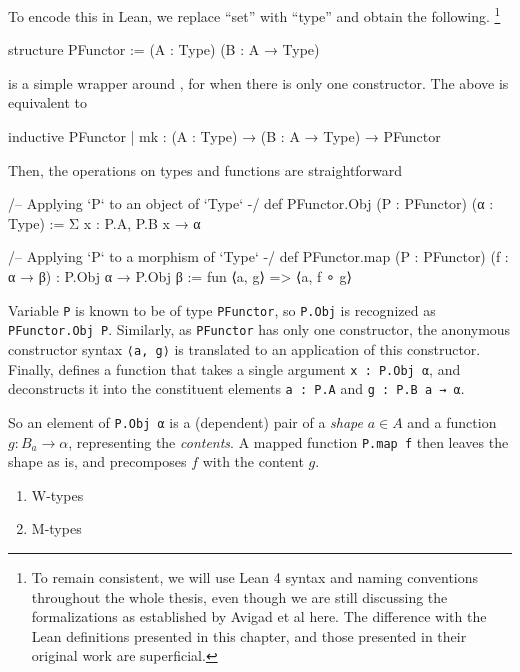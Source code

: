 \documentclass[titlepage]{report}
\newenvironment{remark}{%
\begin{framed}
\begin{trivlist}
    \item[\hskip \labelsep {\bfseries Remark:}]}%
{%
\end{trivlist}%
\end{framed}
}
\newenvironment{todo}{%
\definecolor{shadecolor}{HTML}{F8E0E0}%
\begin{shaded}%
\begin{trivlist}                         
    \item[\hskip \labelsep {\bfseries Todo:}]}{\end{trivlist}\end{shaded}}
\newcommand\inductive{\lean{inductive}}
\begin{document}
To encode this in Lean, we replace ``set'' with ``type'' and obtain the following.
\footnote{To remain consistent, we will use Lean 4 syntax and naming conventions throughout the whole thesis, even though we are still discussing the formalizations as established by Avigad et al here. The difference with the Lean definitions presented in this chapter, and those presented in their original work are superficial.}
\begin{leancode}
    structure PFunctor := (A : Type) (B : A → Type)
\end{leancode}

\begin{remark}
     is a simple wrapper around \inductive, for when there is only one constructor.
    The above is equivalent to
    \begin{leancode}
        inductive PFunctor 
        | mk : (A : Type) → (B : A → Type) → PFunctor
    \end{leancode}
\end{remark}

Then, the operations on types and functions are straightforward
\begin{leancode}
    /-- Applying `P` to an object of `Type` -/
    def PFunctor.Obj (P : PFunctor) (α : Type)
        := Σ x : P.A, P.B x → α

    /-- Applying `P` to a morphism of `Type` -/
    def PFunctor.map (P : PFunctor) (f : α → β) : P.Obj α → P.Obj β 
        := fun ⟨a, g⟩ => ⟨a, f ∘ g⟩
\end{leancode}

\begin{remark}
    Variable \texttt{P} is known to be of type \texttt{PFunctor}, so \texttt{P.Obj} is recognized as \texttt{PFunctor.Obj P}. Similarly, as \texttt{PFunctor} has only one constructor, the anonymous constructor syntax \texttt{⟨a, g⟩} is translated to an application of this constructor.
    Finally,  defines a function that takes a single argument \texttt{x : P.Obj α}, and deconstructs it into the constituent elements \texttt{a : P.A} and \texttt{g : P.B a → α}.
\end{remark}

So an element of \texttt{P.Obj α} is a (dependent) pair of a \emph{shape} $a ∈ A$ and a function $g : B_a \rightarrow \alpha$, representing the \emph{contents}. A mapped function \texttt{P.map f} then leaves the shape as is, and precomposes $f$ with the content $g$.

\begin{todo}
    \begin{enumerate}
        \item W-types
        \item M-types
    \end{enumerate}
\end{todo}
\end{document}
